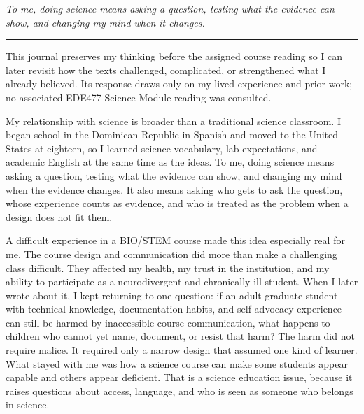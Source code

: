 \documentclass[11pt]{article}
\newcommand{\reviewsection}[1]{%
  \par\Needspace{4\baselineskip}\addvspace{0.10in}%
  \noindent{\large\bfseries\color{PrimaryRed}#1}\par
  \vspace{0.025in}%
}
\begin{document}
\begin{titlepage}
\vfill

\begin{center}
\begin{minipage}{0.92\textwidth}
\centering\itshape
To me, doing science means asking a question, testing what the evidence can show, and changing my mind when it changes.\\
{\color{PrimaryRed}\rule{4.5in}{0.8pt}}
\end{minipage}
\end{center}

\vfill

\begin{center}
\begin{minipage}{0.95\textwidth}
\small
This journal preserves my thinking before the assigned course reading so I can later revisit how the texts challenged, complicated, or strengthened what I already believed. Its response draws only on my lived experience and prior work; no associated EDE477 Science Module reading was consulted.
\end{minipage}
\end{center}

\restoregeometry
\end{titlepage}

\hypersetup{pageanchor=true}
\pagestyle{fancy}
\fancyhf{}
\cfoot{\small\thepage}
\renewcommand{\headrulewidth}{0.4pt}
\setlength{\headheight}{14pt}

\reviewsection{Experience, Evidence, and Science}

My relationship with science is broader than a traditional science classroom. I began school in the Dominican Republic in Spanish and moved to the United States at eighteen, so I learned science vocabulary, lab expectations, and academic English at the same time as the ideas. To me, doing science means asking a question, testing what the evidence can show, and changing my mind when the evidence changes. It also means asking who gets to ask the question, whose experience counts as evidence, and who is treated as the problem when a design does not fit them.

A difficult experience in a BIO/STEM course made this idea especially real for me. The course design and communication did more than make a challenging class difficult. They affected my health, my trust in the institution, and my ability to participate as a neurodivergent and chronically ill student. When I later wrote about it, I kept returning to one question: if an adult graduate student with technical knowledge, documentation habits, and self-advocacy experience can still be harmed by inaccessible course communication, what happens to children who cannot yet name, document, or resist that harm? The harm did not require malice. It required only a narrow design that assumed one kind of learner. What stayed with me was how a science course can make some students appear capable and others appear deficient. That is a science education issue, because it raises questions about access, language, and who is seen as someone who belongs in science.
\end{document}
